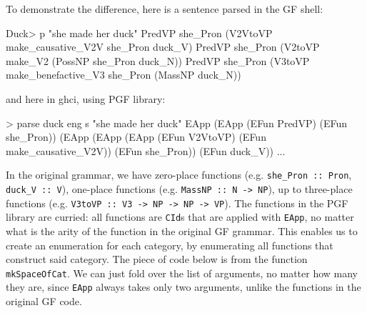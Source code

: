\documentclass[]{article}
\newenvironment{Shaded}{\begin{snugshade}}{\end{snugshade}}
\newcommand{\DataTypeTok}[1]{\textcolor[rgb]{0.13,0.29,0.53}{{#1}}}
\newcommand{\StringTok}[1]{\textcolor[rgb]{0.31,0.60,0.02}{{#1}}}
\newcommand{\FunctionTok}[1]{\textcolor[rgb]{0.00,0.00,0.00}{{#1}}}
\newcommand{\NormalTok}[1]{{#1}}
\begin{document}
To demonstrate the difference, here is a sentence parsed in the GF
shell:

\begin{Shaded}
\begin{Highlighting}[]
\DataTypeTok{Duck}\FunctionTok{>} \NormalTok{p }\StringTok{"she made her duck"}
\DataTypeTok{PredVP} \NormalTok{she_Pron (}\DataTypeTok{V2VtoVP} \NormalTok{make_causative_V2V she_Pron duck_V)}
\DataTypeTok{PredVP} \NormalTok{she_Pron (}\DataTypeTok{V2toVP} \NormalTok{make_V2 (}\DataTypeTok{PossNP} \NormalTok{she_Pron duck_N))}
\DataTypeTok{PredVP} \NormalTok{she_Pron (}\DataTypeTok{V3toVP} \NormalTok{make_benefactive_V3 she_Pron (}\DataTypeTok{MassNP} \NormalTok{duck_N))}
\end{Highlighting}
\end{Shaded}

and here in ghci, using PGF library:

\begin{Shaded}
\begin{Highlighting}[]
\FunctionTok{>} \NormalTok{parse duck eng s }\StringTok{"she made her duck"}
\DataTypeTok{EApp} \NormalTok{(}\DataTypeTok{EApp} \NormalTok{(}\DataTypeTok{EFun} \DataTypeTok{PredVP}\NormalTok{)}
           \NormalTok{(}\DataTypeTok{EFun} \NormalTok{she_Pron)) }
     \NormalTok{(}\DataTypeTok{EApp} \NormalTok{(}\DataTypeTok{EApp} \NormalTok{(}\DataTypeTok{EApp} \NormalTok{(}\DataTypeTok{EFun} \DataTypeTok{V2VtoVP}\NormalTok{) }
                       \NormalTok{(}\DataTypeTok{EFun} \NormalTok{make_causative_V2V)) }
                 \NormalTok{(}\DataTypeTok{EFun} \NormalTok{she_Pron)) }
           \NormalTok{(}\DataTypeTok{EFun} \NormalTok{duck_V))}
\FunctionTok{...}
\end{Highlighting}
\end{Shaded}

In the original grammar, we have zero-place functions (e.g.
\texttt{she\_Pron :: Pron}, \texttt{duck\_V :: V}), one-place functions
(e.g. \texttt{MassNP :: N -\textgreater{} NP}), up to three-place
functions (e.g.
\texttt{V3toVP :: V3 -\textgreater{} NP -\textgreater{} NP -\textgreater{} VP}).
The functions in the PGF library are curried: all functions are
\texttt{CId}s that are applied with \texttt{EApp}, no matter what is the
arity of the function in the original GF grammar. This enables us to
create an enumeration for each category, by enumerating all functions
that construct said category. The piece of code below is from the
function \texttt{mkSpaceOfCat}. We can just fold over the list of
arguments, no matter how many they are, since \texttt{EApp} always takes
only two arguments, unlike the functions in the original GF code.
\end{document}
